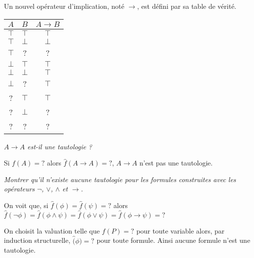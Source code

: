 Un nouvel opérateur d'implication, noté $\rightarrow $, est défini par sa table de vérité.
\begin{center}
\begin{tabular}{|c|c|c|}
\hline
$A$ & $B$ & $A\rightarrow B$ \\ 
\hline
$\top $ & $\top $ & $\top $ \\ 
$\top $ & $\bot $ & $\bot $ \\
$\top $ & ? & ? \\ 
$\bot $ & $\top $ & $\top $ \\ 
$\bot $ & $\bot $ & $\top $ \\
$\bot $ & ? & $\top $ \\ 
? & $\top $ & $\top $ \\
? & $\bot $ & ? \\ 
? & ? & ? \\ 
\hline
\end{tabular}%
\end{center}
\begin{Exercise}\it
$A\rightarrow A$ est-il une tautologie ?
\end{Exercise}
\begin{Answer}
Si $f(A)=?$ alors $\widehat f(A\rightarrow A) = ?$, $A\rightarrow A$ n'est pas une tautologie. 
\end{Answer}
\begin{Exercise}\it
Montrer qu'il n'existe aucune tautologie pour les formules construites avec les opérateurs $\neg$, $\vee$, $\wedge$ et $\rightarrow$.
\end{Exercise}
\begin{Answer}

On voit que, si $\widehat f(\phi)=\widehat f (\psi) = ?$ alors $\widehat f(\neg\phi) = \widehat f(\phi \wedge \psi) = \widehat f(\phi \vee \psi) = \widehat f(\phi \rightarrow \psi) = ?$

On choisit la valuation telle que $f(P) = ?$ pour toute variable alors, par induction structurelle, $\widehat(\phi) = ?$ pour toute formule. Ainsi aucune formule n'est une tautologie.

\end{Answer}


